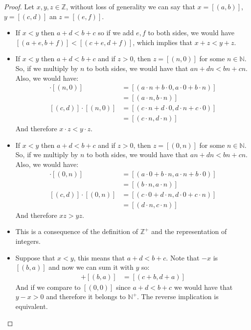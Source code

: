 \documentclass{tufte-handout}
\begin{document}
\begin{proof}
	Let $x, y, z \in \mathbb{Z}$, without loss of generality we can say that $x = [(a, b)]$, $y = [(c, d)]$ an $z = [(e, f)]$.
	\begin{itemize}
		\item If $x < y$ then $a + d < b + c$ so if we add $e, f$ to both sides, we would have $[(a + e, b+f)] < [(c+e, d+f)]$, which implies that $x + z < y + z$.
		\item If $x < y$ then $a + d < b + c$ and if $z > 0$, then $z = [(n, 0)]$ for some $n \in \mathbb{N}$. So, if we multiply by $n$ to both sides, we would have that $an+dn < bn+cn$. Also, we would have:
		\begin{align*}
			[(a, b)]\cdot [(n, 0)] &= [(a \cdot n + b \cdot 0, a \cdot 0 + b \cdot n)]\\
			&= [(a\cdot n, b\cdot n)]\\ 
			[(c, d)]\cdot [(n, 0)] &= [(c\cdot n + d\cdot 0, d \cdot n + c \cdot 0)]\\
			&= [(c\cdot n, d\cdot n)]
		\end{align*} 
		And therefore $x \cdot z < y \cdot z$.

		\item If $x < y$ then $a + d < b + c$ and if $z > 0$, then $z = [(0, n)]$ for some $n \in \mathbb{N}$. So, if we multiply by $n$ to both sides, we would have that $an + dn < bn + cn$. Also, we would have:
		\begin{align*}
			[(a, b)]\cdot [(0, n)] &= [(a \cdot 0 + b \cdot n, a \cdot n + b \cdot 0)]\\
			&= [(b\cdot n, a\cdot n)]\\ 
			[(c, d)]\cdot [(0, n)] &= [(c\cdot 0 + d\cdot n, d \cdot 0 + c \cdot n)]\\
			&= [(d\cdot n, c\cdot n)]
		\end{align*}
		And therefore $xz > yz$.

		\item This is a consequence of the definition of $\mathbb{Z}^+$ and the representation of integers.
		\item Suppose that $x < y$, this means that $a + d < b + c$. Note that $-x$ is $[(b, a)]$ and now we can sum it with $y$ so:
		\begin{align*}
			[(c, d)] + [(b, a)] &= [(c + b, d + a)]
		\end{align*}
		And if we compare to $[(0, 0)]$ since $a + d < b + c$ we would have that $y - x > 0$ and therefore it belongs to $\mathbb{N}^+$. The reverse implication is equivalent.
	\end{itemize}
\end{proof}
\end{document}
